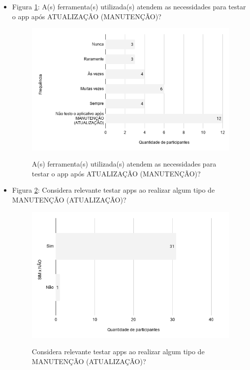 \begin{itemize}
    
    \item Figura \ref{figure:s_ferramentasexpectativas}: A(s) ferramenta(s) utilizada(s) atendem as necessidades para testar o app após ATUALIZAÇÃO (MANUTENÇÃO)?
        \begin{figure}[!htb]
        \centering
        \includegraphics[width=.80\textwidth]{images/s_ferramentasexpectativas.png}
        \label{figure:s_ferramentasexpectativas}
        \caption{A(s) ferramenta(s) utilizada(s) atendem as necessidades para testar o app após ATUALIZAÇÃO (MANUTENÇÃO)?}
        \end{figure}
    
    
    
    
    \item Figura \ref{figure:s_imptestarmanutencao}: Considera relevante testar apps ao realizar algum tipo de MANUTENÇÃO (ATUALIZAÇÃO)?
        \begin{figure}[!htb]
        \centering
        \includegraphics[width=.80\textwidth]{images/s_imptestarmanutencao.png}
        \label{figure:s_imptestarmanutencao}
        \caption{Considera relevante testar apps ao realizar algum tipo de MANUTENÇÃO (ATUALIZAÇÃO)?}
        \end{figure}
    

\end{itemize}
